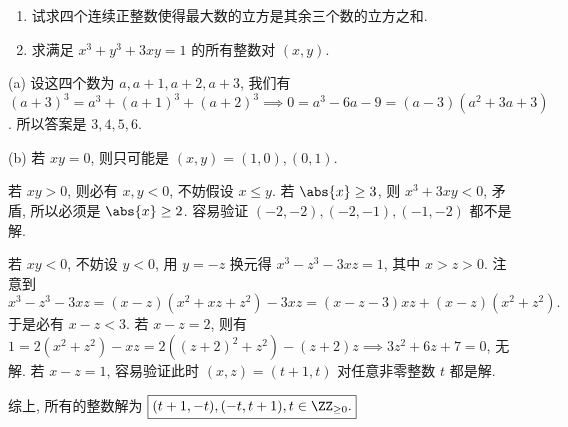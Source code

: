 \begin{prob}
\label{prob:prob-5}
\begin{enumerate}[label={\normalfont(\alph*)}]
\item 试求四个连续正整数使得最大数的立方是其余三个数的立方之和.
\item  求满足 $x^3 + y^3 + 3xy = 1$ 的所有整数对 $(x,y)$.
\end{enumerate}
\end{prob}

\begin{soln}
(a) 设这四个数为 $a, a+1, a+2, a+3$,
我们有 $(a+3)^3 = a^3 + (a+1)^3 + (a+2)^3 \implies
0 = a^3 - 6a - 9 = (a-3)(a^2 + 3a + 3)$.
所以答案是 $\boxed{3,4,5,6.}$

\bigskip

(b) 若 $xy = 0$, 则只可能是 $(x,y) = (1,0), (0,1)$.

\bigskip

若 $xy > 0$, 则必有 $x,y < 0$, 不妨假设 $x \le y$.
若 $\abs{x} \ge 3$, 则 $x^3 + 3xy < 0$, 矛盾, 所以必须是 $\abs{x} \ge 2$.
容易验证 $(-2,-2), (-2,-1), (-1,-2)$ 都不是解.

\bigskip

若 $xy < 0$, 不妨设 $y < 0$, 用 $y = -z$ 换元得 $x^3 - z^3 - 3xz = 1$,
其中 $x > z > 0$. 注意到
\[x^3 - z^3 - 3xz = (x-z)(x^2 + xz + z^2) - 3xz = (x-z-3)xz + (x-z)(x^2 + z^2).\]
于是必有 $x - z < 3$.
若 $x - z = 2$, 则有 $1 = 2(x^2 + z^2) - xz =
2((z+2)^2 + z^2) - (z+2)z \implies 3z^2 + 6z + 7 = 0$, 无解.
若 $x - z = 1$, 容易验证此时 $(x,z) = (t+1,t)$ 对任意非零整数 $t$ 都是解.

综上, 所有的整数解为 $\boxed{(t+1,-t), (-t,t+1), t \in \ZZ_{\ge 0}.}$
\end{soln}
